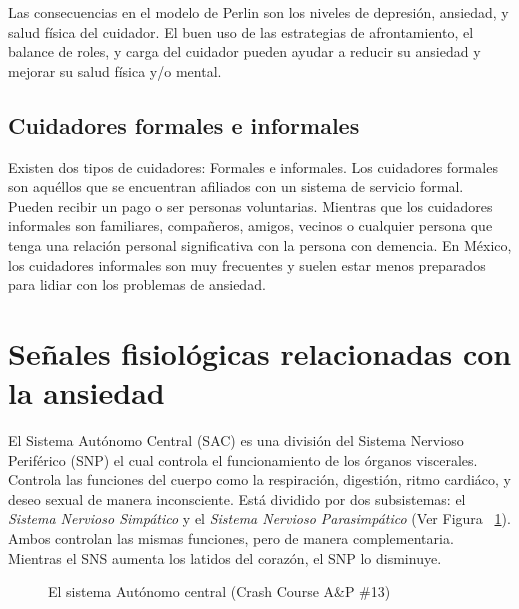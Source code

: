 	Las consecuencias en el modelo de Perlin son los niveles de depresi\'on, ansiedad, y salud f\'isica del cuidador. El buen uso de las estrategias de afrontamiento, el balance de roles, y carga del cuidador pueden ayudar a reducir su ansiedad y mejorar su salud f\'isica y/o mental.

	\subsection{Cuidadores formales e informales}\label{secc:caregivers}
		Existen dos tipos de cuidadores: Formales e informales. Los cuidadores formales son aqu\'ellos que se encuentran afiliados con un sistema de servicio formal. Pueden recibir un pago o ser personas voluntarias. Mientras que los cuidadores informales son familiares, compa\~neros, amigos, vecinos o cualquier persona que tenga una relaci\'on personal significativa con la persona con demencia. En M\'exico, los cuidadores informales son muy frecuentes y suelen estar menos preparados para lidiar con los problemas de ansiedad.

	\section{Se\~nales fisiol\'ogicas relacionadas con la ansiedad}\label{secc:signals}
	El Sistema Aut\'onomo Central (SAC) es una divisi\'on del Sistema Nervioso Perif\'erico (SNP) el cual controla el funcionamiento de los \'organos viscerales. Controla las funciones del cuerpo como la respiraci\'on, digesti\'on, ritmo cardi\'aco, y deseo sexual de manera inconsciente. Est\'a dividido por dos subsistemas: el \textit{Sistema Nervioso Simp\'atico} y el \textit{Sistema Nervioso Parasimp\'atico} (Ver Figura ~\ref{fig:modeloSNP}). Ambos controlan las mismas funciones, pero de manera complementaria. Mientras el SNS aumenta los latidos del coraz\'on, el SNP lo disminuye.

\begin{figure}[h]
	\centering
	\caption{El sistema Aut\'onomo central (Crash Course A\&P \#13) \label{fig:modeloSNP}}
\end{figure}

